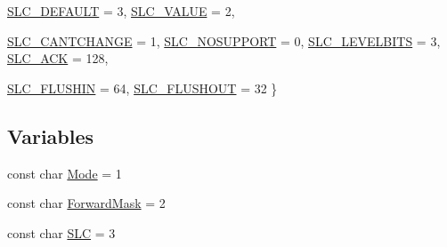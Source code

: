 \begin{DoxyCompactItemize}
\hyperlink{namespaceLineMode_abebf06755a3b54a53f1f650f5be54e3ba31f682392b0ea69ff99eafc6bae536b9}{SLC\_\-DEFAULT} =  3, 
\hyperlink{namespaceLineMode_abebf06755a3b54a53f1f650f5be54e3ba135924f4860ff1c8bf3a62ec80d3382e}{SLC\_\-VALUE} =  2, 
\par
\hyperlink{namespaceLineMode_abebf06755a3b54a53f1f650f5be54e3baeb9538ccc1c859d30abd812b1ce8c425}{SLC\_\-CANTCHANGE} =  1, 
\hyperlink{namespaceLineMode_abebf06755a3b54a53f1f650f5be54e3bada44ceb09a5f8edb6576c9c0a12f2a77}{SLC\_\-NOSUPPORT} =  0, 
\hyperlink{namespaceLineMode_abebf06755a3b54a53f1f650f5be54e3baa9382aac8d130cc63022182d259d8ed2}{SLC\_\-LEVELBITS} =  3, 
\hyperlink{namespaceLineMode_abebf06755a3b54a53f1f650f5be54e3bad5070eb9f249c1a7e7e44425ed2aefd4}{SLC\_\-ACK} =  128, 
\par
\hyperlink{namespaceLineMode_abebf06755a3b54a53f1f650f5be54e3bae8bd3238087d02bb9bd0b04a0b97a59b}{SLC\_\-FLUSHIN} =  64, 
\hyperlink{namespaceLineMode_abebf06755a3b54a53f1f650f5be54e3ba83b0525ca2be6370007984d756f099e2}{SLC\_\-FLUSHOUT} =  32
 \}
\end{DoxyCompactItemize}
\subsection*{Variables}
\begin{DoxyCompactItemize}
\item 
const char \hyperlink{namespaceLineMode_a0856e552cef22379961d80f018154a18}{Mode} = 1
\item 
const char \hyperlink{namespaceLineMode_a05d9f57c1b284d291144d033f2af85fe}{ForwardMask} = 2
\item 
const char \hyperlink{namespaceLineMode_a4a0d3e56ac29300bfaca0df198a19c32}{SLC} = 3
\end{DoxyCompactItemize}


